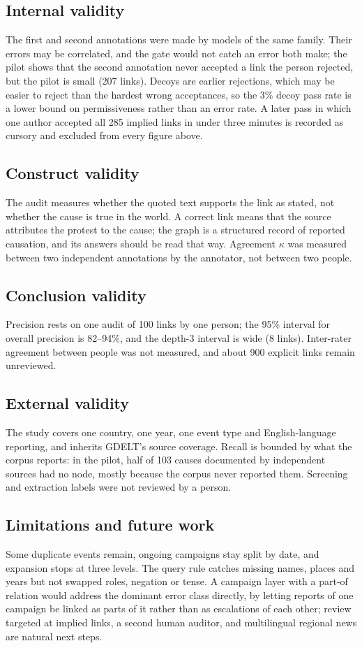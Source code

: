 \documentclass[pdflatex,sn-basic,lineno]{sn-jnl}
\theoremstyle{thmstylethree}
\theoremstyle{thmstyleone}
\begin{document}
\subsection{Internal validity}
The first and second annotations were made by models of the same family. Their errors may be
correlated, and the gate would not catch an error both make; the pilot shows that the second
annotation never accepted a link the person rejected, but the pilot is small (207 links). Decoys
are earlier rejections, which may be easier to reject than the hardest wrong acceptances, so the
3\% decoy pass rate is a lower bound on permissiveness rather than an error rate. A later pass in
which one author accepted all 285 implied links in under three minutes is recorded as cursory and
excluded from every figure above.

\subsection{Construct validity}
The audit measures whether the quoted text supports the link as stated, not whether the cause is
true in the world. A correct link means that the source attributes the protest to the cause; the
graph is a structured record of reported causation, and its answers should be read that way.
Agreement $\kappa$ was measured between two independent annotations by the annotator, not between
two people.

\subsection{Conclusion validity}
Precision rests on one audit of 100 links by one person; the 95\% interval for overall precision
is 82--94\%, and the depth-3 interval is wide (8 links). Inter-rater agreement between people was
not measured, and about 900 explicit links remain unreviewed.

\subsection{External validity}
The study covers one country, one year, one event type and English-language reporting, and inherits
GDELT's source coverage. Recall is bounded by what the corpus reports: in the pilot, half of 103
causes documented by independent sources had no node, mostly because the corpus never reported
them. Screening and extraction labels were not reviewed by a person.

\subsection{Limitations and future work}
Some duplicate events remain, ongoing campaigns stay split by date, and expansion stops at three
levels. The query rule catches missing names, places and years but not swapped roles, negation or
tense. A campaign layer with a part-of relation would address the dominant error class directly, by
letting reports of one campaign be linked as parts of it rather than as escalations of each other;
review targeted at implied links, a second human auditor, and multilingual regional news are
natural next steps.
\end{document}
